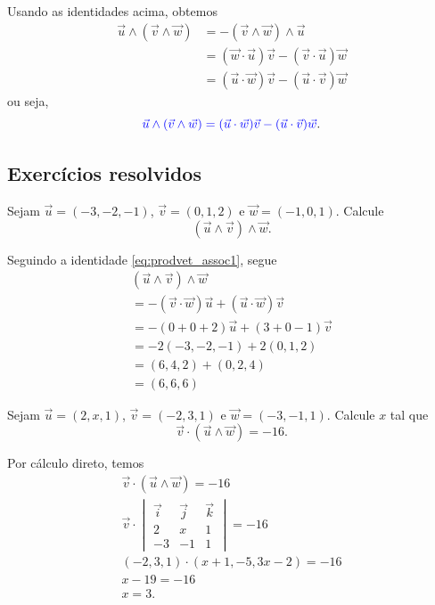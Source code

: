 Usando as identidades acima, obtemos
\begin{align}\label{eq:prodvet_assoc1}
  \vec{u}\land(\vec{v}\land\vec{w}) &= -(\vec{v}\land\vec{w})\land\vec{u}\\
                                    &= (\vec{w}\cdot\vec{u})\vec{v}-(\vec{v}\cdot\vec{u})\vec{w}\\
                                    &= (\vec{u}\cdot\vec{w})\vec{v}-(\vec{u}\cdot\vec{v})\vec{w}
\end{align}
ou seja,
\begin{equation}
  {\color{blue}\vec{u}\land(\vec{v}\land\vec{w}) = (\vec{u}\cdot\vec{w})\vec{v}-(\vec{u}\cdot\vec{v})\vec{w}}.
\end{equation}

\subsection*{Exercícios resolvidos}

\begin{exeresol}
  Sejam $\vec{u}=(-3,-2,-1)$, $\vec{v}=(0,1,2)$ e $\vec{w}=(-1,0,1)$. Calcule
  \begin{equation}
    (\vec{u}\land\vec{v})\land\vec{w}.
  \end{equation}
\end{exeresol}
\begin{resol}
  Seguindo a identidade \eqref{eq:prodvet_assoc1}, segue
  \begin{gather}
    (\vec{u}\land\vec{v})\land\vec{w} \\
    = -(\vec{v}\cdot\vec{w})\vec{u} + (\vec{u}\cdot\vec{w})\vec{v}\\
    = -(0+0+2)\vec{u} + (3+0-1)\vec{v}\\
    = -2(-3,-2,-1)+2(0,1,2)\\
    = (6,4,2)+(0,2,4)\\
    = (6,6,6)
  \end{gather}
\end{resol}


\begin{exeresol}
  Sejam $\vec{u}=(2,x,1)$, $\vec{v}=(-2,3,1)$ e $\vec{w}=(-3,-1,1)$. Calcule $x$ tal que
  \begin{equation}
    \vec{v}\cdot(\vec{u}\land\vec{w})=-16.
  \end{equation}
\end{exeresol}
\begin{resol}
  Por cálculo direto, temos
  \begin{gather}
    \vec{v}\cdot(\vec{u}\land\vec{w})=-16\\
    \vec{v}\cdot
    \begin{vmatrix}
      \vec{i} & \vec{j} & \vec{k}\\
      2 & x & 1 \\
      -3 & -1 & 1
    \end{vmatrix} = -16 \\
    (-2,3,1)\cdot(x+1,-5,3x-2)=-16\\
    x-19 = -16 \\
    x = 3.
  \end{gather}
\end{resol}

